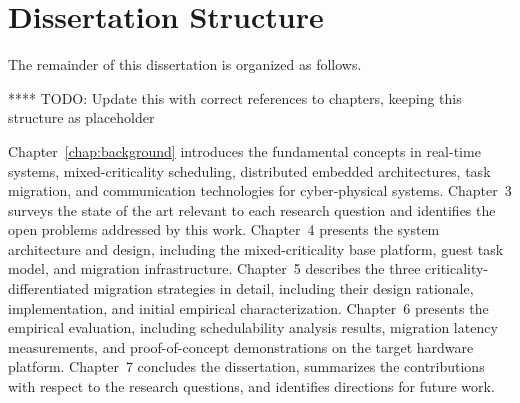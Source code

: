 \section{Dissertation Structure}
\label{sec:structure}

The remainder of this dissertation is organized as follows.

**** TODO: Update this with correct references to chapters, keeping this structure as placeholder

Chapter~\ref{chap:background} introduces the fundamental concepts in real-time systems,
mixed-criticality scheduling, distributed embedded architectures, task migration, and
communication technologies for cyber-physical systems.
Chapter~3 surveys the state of the art relevant to each research question and
identifies the open problems addressed by this work.
Chapter~4 presents the system architecture and design, including the mixed-criticality
base platform, guest task model, and migration infrastructure.
Chapter~5 describes the three criticality-differentiated migration strategies in detail,
including their design rationale, implementation, and initial empirical characterization.
Chapter~6 presents the empirical evaluation, including schedulability analysis results,
migration latency measurements, and proof-of-concept demonstrations on the target
hardware platform.
Chapter~7 concludes the dissertation, summarizes the contributions with respect to the
research questions, and identifies directions for future work.
